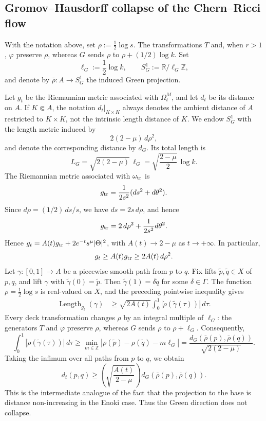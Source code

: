 \documentclass[12pt]{amsart}
\numberwithin{equation}{section}
\theoremstyle{remark}
\theoremstyle{definition}
\begin{document}
\subsection{Gromov--Hausdorff collapse of the Chern--Ricci flow}

With the notation above, set $\rho:=\frac12\log s$.
The transformations $T$ and, when $r>1$, $\varphi$ preserve $\rho$, whereas $G$ sends $\rho$ to $\rho+(1/2)\log k$. Set
$$
\ell_G:=\frac12\log k,
\qquad
S^1_G:=\mathbb{R}/\ell_G\mathbb{Z},
$$
and denote by $\bar\rho:A\longrightarrow S^1_G$ the induced Green projection.

Let $g_t$ be the Riemannian metric associated with $\Omega_t^M$, and let
$d_t$ be its distance on $A$. If $K\Subset A$, the notation
$d_t|_{K\times K}$ always denotes the ambient distance of $A$ restricted to
$K\times K$, not the intrinsic length distance of $K$. We endow $S^1_G$
with the length metric induced by
$$
2(2-\mu)\,d\rho^2,
$$
and denote the corresponding distance by $d_G$. Its total length is
$$ L_G=\sqrt{2(2-\mu)}\,\ell_G=\sqrt{\frac{2-\mu}{2}}\,\log k.$$
The Riemannian metric associated with $\omega_{\rm tr}$ is
\begin{equation*}
g_{\rm tr}
=
\frac{1}{2s^2}(ds^2+d\theta^2).
\end{equation*}
Since $d\rho=(1/2)\,ds/s$, we have $ds=2s\,d\rho$, and hence
\begin{equation*}
g_{\rm tr}
=
2\,d\rho^2+\frac{1}{2s^2}d\theta^2.
\end{equation*}
Hence $g_t = A(t)g_{\rm tr} + 2e^{-t}s^\mu|\Theta|^2$, with $A(t)\longrightarrow 2-\mu$ as $t\to+\infty$.
In particular,
$$
g_t\geq A(t)g_{\rm tr}\geq 2A(t)\,d\rho^2.
$$
Let $\gamma:[0,1]\to A$ be a piecewise smooth path from $p$ to $q$. Fix lifts $\tilde p,\tilde q\in X$ of $p,q$, and lift $\gamma$ with $\widetilde\gamma(0)=\tilde p$. Then $\widetilde\gamma(1)=\delta\tilde q$ for some $\delta\in\Gamma$. The function $\rho=\frac12\log s$ is real-valued on $X$, and the preceding pointwise inequality gives
\begin{align*}
\operatorname{Length}_{g_t}(\gamma)
&\geq
\sqrt{2A(t)}
\int_0^1|\dot\rho(\widetilde\gamma(\tau))|\,d\tau.
\end{align*}
Every deck transformation changes $\rho$ by an integral multiple of $\ell_G$: the generators $T$ and $\varphi$ preserve $\rho$, whereas $G$ sends $\rho$ to $\rho+\ell_G$. Consequently,
$$
\int_0^1|\dot\rho(\widetilde\gamma(\tau))|\,d\tau
\geq
\min_{m\in\mathbb Z}|\rho(\tilde p)-\rho(\tilde q)-m\ell_G|
=
\frac{d_G(\bar\rho(p),\bar\rho(q))}{\sqrt{2(2-\mu)}}.
$$
Taking the infimum over all paths from $p$ to $q$, we obtain
\begin{equation}
\label{eq:GH-lower-bound}
d_t(p,q)
\geq
\left(\sqrt{\frac{A(t)}{2-\mu}}\right)
d_G(\bar\rho(p),\bar\rho(q)).
\end{equation}
This is the intermediate analogue of the fact that the projection to the base is
distance non-increasing in the Enoki case. Thus the Green direction does not collapse.
\end{document}
